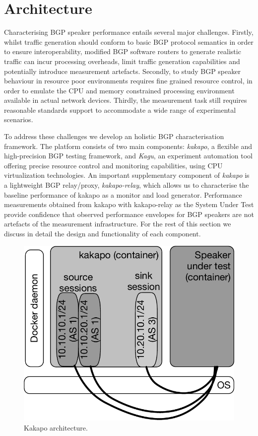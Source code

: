 \section{Architecture}\label{sec:arch}

Characterising BGP speaker performance entails several major challenges.
Firstly, whilst traffic generation should conform to basic BGP protocol
semantics in order to ensure interoperability, modified BGP software routers to
generate realistic traffic can incur processing overheads, limit traffic
generation capabilities and potentially introduce measurement artefacts.
Secondly, to study BGP speaker behaviour in resource poor environments requires
fine grained resource control, in order to emulate the CPU and memory
constrained processing environment available in actual network devices.
Thirdly, the measurement task still requires reasonable standards support
to accommodate a wide range of experimental scenarios.

To address these challenges we develop an holistic BGP characterisation
framework. The platform consists of two main components: {\it kakapo},
a flexible and high-precision BGP testing framework, and
	{\it Kagu}, an experiment automation tool offering precise resource control
and monitoring capabilities, using CPU virtualization technologies.  An
important supplementary component of {\it kakapo} is a lightweight BGP
relay/proxy, {\it kakapo-relay}, which allows us to characterise the baseline
performance of kakapo as a monitor and load generator.  Performance
measurements obtained from kakapo with kakapo-relay as the System Under Test
provide confidence that observed performance envelopes for BGP speakers are not
artefacts of the measurement infrastructure.  For the rest of this section we
discuss in detail the design and functionality of each component.

\begin{figure}
	\centering
	\includegraphics[width=.45\linewidth]{images/arch.pdf}
	\caption{Kakapo architecture.}\label{fig:arch}
\end{figure}

